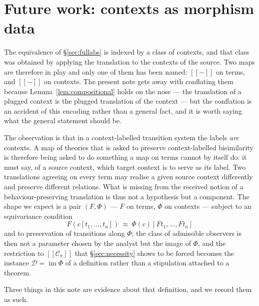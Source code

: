 \documentclass[11pt]{article}
\theoremstyle{definition}
\theoremstyle{plain}
\theoremstyle{remark}
\newcommand{\enc}[1]{[\![#1]\!]}
\newcommand{\Ctx}{\mathscr{C}}
\newcommand{\Obs}{\mathcal{D}}
\begin{document}
\section{Future work: contexts as morphism data}\label{sec:future}

The equivalence of \S\ref{sec:fullabs} is indexed by a class of
contexts, and that class was obtained by applying the translation to the
contexts of the source. Two maps are therefore in play and only one of
them has been named: $\enc{-}$ on terms, and $\enc{-}$ on contexts. The
present note gets away with conflating them because
Lemma~\ref{lem:compositional} holds on the nose --- the translation of a
plugged context is the plugged translation of the context --- but the
conflation is an accident of this encoding rather than a general fact,
and it is worth saying what the general statement should be.

The observation is that in a context-labelled transition system the
labels \emph{are} contexts. A map of theories that is asked to preserve
context-labelled bisimilarity is therefore being asked to do something a
map on terms cannot by itself do: it must say, of a source context, which
target context is to serve as its label. Two translations agreeing on
every term may realise a given source context differently and preserve
different relations. What is missing from the received notion of a
behaviour-preserving translation is thus not a hypothesis but a
component. The shape we expect is a pair $(F,\Phi)$ --- $F$ on terms,
$\Phi$ on contexts --- subject to an equivariance condition
\[
  F(c[t_1,\dots,t_n]) \ \approx\ \Phi(c)[F t_1,\dots,F t_n]
\]
and to preservation of transitions along $\Phi$; the class of admissible
observers is then not a parameter chosen by the analyst but the image of
$\Phi$, and the restriction to $\enc{\Ctx_\pi}$ that
\S\ref{sec:necessity} shows to be forced becomes the instance
$\Obs = \operatorname{im}\Phi$ of a definition rather than a stipulation
attached to a theorem.

Three things in this note are evidence about that definition, and we
record them as such.
\end{document}
